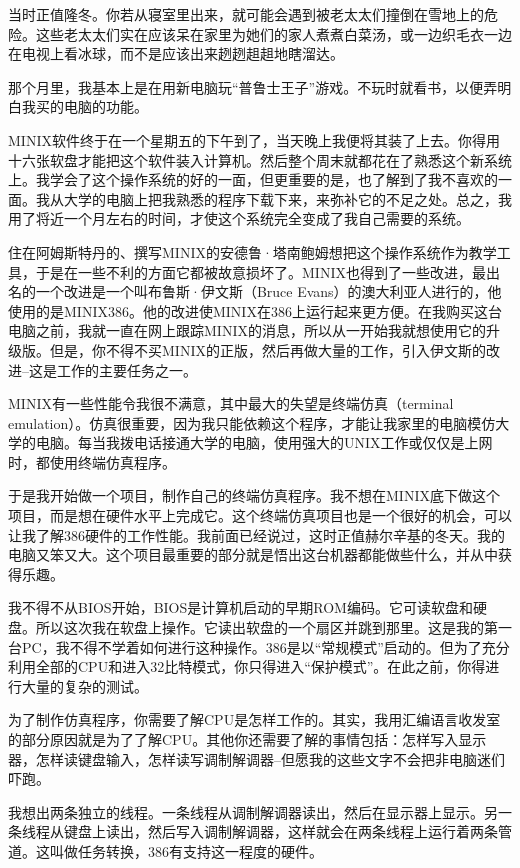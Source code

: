 当时正值隆冬。你若从寝室里出来，就可能会遇到被老太太们撞倒在雪地上的危险。这些老太太们实在应该呆在家里为她们的家人煮煮白菜汤，或一边织毛衣一边在电视上看冰球，而不是应该出来趔趔趄趄地瞎溜达。

那个月里，我基本上是在用新电脑玩“普鲁士王子”游戏。不玩时就看书，以便弄明白我买的电脑的功能。

MINIX软件终于在一个星期五的下午到了，当天晚上我便将其装了上去。你得用十六张软盘才能把这个软件装入计算机。然后整个周末就都花在了熟悉这个新系统上。我学会了这个操作系统的好的一面，但更重要的是，也了解到了我不喜欢的一面。我从大学的电脑上把我熟悉的程序下载下来，来弥补它的不足之处。总之，我用了将近一个月左右的时间，才使这个系统完全变成了我自己需要的系统。

住在阿姆斯特丹的、撰写MINIX的安德鲁·塔南鲍姆想把这个操作系统作为教学工具，于是在一些不利的方面它都被故意损坏了。MINIX也得到了一些改进，最出名的一个改进是一个叫布鲁斯·伊文斯（Bruce Evans）的澳大利亚人进行的，他使用的是MINIX386。他的改进使MINIX在386上运行起来更方便。在我购买这台电脑之前，我就一直在网上跟踪MINIX的消息，所以从一开始我就想使用它的升级版。但是，你不得不买MINIX的正版，然后再做大量的工作，引入伊文斯的改进--这是工作的主要任务之一。

MINIX有一些性能令我很不满意，其中最大的失望是终端仿真（terminal emulation）。仿真很重要，因为我只能依赖这个程序，才能让我家里的电脑模仿大学的电脑。每当我拨电话接通大学的电脑，使用强大的UNIX工作或仅仅是上网时，都使用终端仿真程序。

于是我开始做一个项目，制作自己的终端仿真程序。我不想在MINIX底下做这个项目，而是想在硬件水平上完成它。这个终端仿真项目也是一个很好的机会，可以让我了解386硬件的工作性能。我前面已经说过，这时正值赫尔辛基的冬天。我的电脑又笨又大。这个项目最重要的部分就是悟出这台机器都能做些什么，并从中获得乐趣。

我不得不从BIOS开始，BIOS是计算机启动的早期ROM编码。它可读软盘和硬盘。所以这次我在软盘上操作。它读出软盘的一个扇区并跳到那里。这是我的第一台PC，我不得不学着如何进行这种操作。386是以“常规模式”启动的。但为了充分利用全部的CPU和进入32比特模式，你只得进入“保护模式”。在此之前，你得进行大量的复杂的测试。

为了制作仿真程序，你需要了解CPU是怎样工作的。其实，我用汇编语言收发室的部分原因就是为了了解CPU。其他你还需要了解的事情包括：怎样写入显示器，怎样读键盘输入，怎样读写调制解调器--但愿我的这些文字不会把非电脑迷们吓跑。

我想出两条独立的线程。一条线程从调制解调器读出，然后在显示器上显示。另一条线程从键盘上读出，然后写入调制解调器，这样就会在两条线程上运行着两条管道。这叫做任务转换，386有支持这一程度的硬件。

